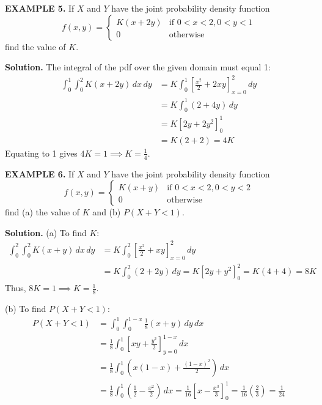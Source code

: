 \documentclass{article}
\begin{document}
\vspace{1em}

\textbf{EXAMPLE 5.} If $X$ and $Y$ have the joint probability density function
$$
f(x, y) = \begin{cases} K(x+2y) & \text{if } 0 < x < 2, 0 < y < 1 \\ 0 & \text{otherwise} \end{cases}
$$
find the value of $K$.

\textbf{Solution.} The integral of the pdf over the given domain must equal 1:
\begin{align*}
\int_{0}^{1} \int_{0}^{2} K(x+2y) \,dx \,dy &= K \int_{0}^{1} \left[ \frac{x^2}{2} + 2xy \right]_{x=0}^{2} \,dy \\
&= K \int_{0}^{1} (2 + 4y) \,dy \\
&= K \left[ 2y + 2y^2 \right]_{0}^{1} \\
&= K(2 + 2) = 4K
\end{align*}
Equating to 1 gives $4K = 1 \implies K = \frac{1}{4}$.

\vspace{1em}

\textbf{EXAMPLE 6.} If $X$ and $Y$ have the joint probability density function
$$
f(x, y) = \begin{cases} K(x+y) & \text{if } 0 < x < 2, 0 < y < 2 \\ 0 & \text{otherwise} \end{cases}
$$
find (a) the value of $K$ and (b) $P(X +Y < 1)$.

\textbf{Solution.} 
(a) To find $K$:
\begin{align*}
\int_{0}^{2} \int_{0}^{2} K(x+y) \,dx \,dy &= K \int_{0}^{2} \left[ \frac{x^2}{2} + xy \right]_{x=0}^{2} \,dy \\
&= K \int_{0}^{2} (2 + 2y) \,dy = K \left[ 2y + y^2 \right]_{0}^{2} = K(4+4) = 8K
\end{align*}
Thus, $8K = 1 \implies K = \frac{1}{8}$.

(b) To find $P(X+Y < 1)$:
\begin{align*}
P(X+Y < 1) &= \int_{0}^{1} \int_{0}^{1-x} \frac{1}{8}(x+y) \,dy \,dx \\
&= \frac{1}{8} \int_{0}^{1} \left[ xy + \frac{y^2}{2} \right]_{y=0}^{1-x} \,dx \\
&= \frac{1}{8} \int_{0}^{1} \left( x(1-x) + \frac{(1-x)^2}{2} \right) \,dx \\
&= \frac{1}{8} \int_{0}^{1} \left( \frac{1}{2} - \frac{x^2}{2} \right) \,dx = \frac{1}{16} \left[ x - \frac{x^3}{3} \right]_{0}^{1} = \frac{1}{16} \left( \frac{2}{3} \right) = \frac{1}{24}
\end{align*}
\end{document}
